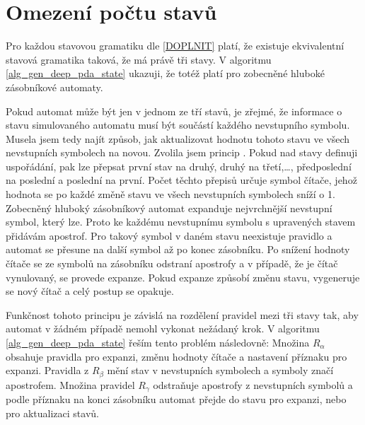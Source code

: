 \section{Omezení počtu stavů}


Pro každou stavovou gramatiku dle \ref{DOPLNIT} platí, že existuje ekvivalentní stavová gramatika taková, že má právě tři stavy. V algoritmu \ref{alg_gen_deep_pda_state} ukazuji, že totéž platí pro zobecněné hluboké zásobníkové automaty.

Pokud automat může být jen v jednom ze tří stavů, je zřejmé, že informace o stavu simulovaného automatu musí být součástí každého nevstupního symbolu. Musela jsem tedy najít způsob, jak aktualizovat hodnotu tohoto stavu ve všech nevstupních symbolech na novou. Zvolila jsem princip . Pokud nad stavy definuji uspořádání, pak lze přepsat první stav na druhý, druhý na třetí,\dots, předposlední na poslední a poslední na první. Počet těchto přepisů určuje symbol čítače, jehož hodnota se po každé změně stavu ve všech nevstupních symbolech sníží o 1. Zobecněný hluboký zásobníkový automat expanduje nejvrchnější nevstupní symbol, který lze. Proto ke každému nevstupnímu symbolu s upravených stavem přidávám apostrof. Pro takový symbol v daném stavu neexistuje pravidlo a automat se přesune na další symbol až po konec zásobníku. Po snížení hodnoty čítače se ze symbolů na zásobníku odstraní apostrofy a v případě, že je čítač vynulovaný, se provede expanze. Pokud expanze způsobí změnu stavu, vygeneruje se nový čítač a celý postup se opakuje.

Funkčnost tohoto principu je závislá na rozdělení pravidel mezi tři stavy tak, aby automat v žádném případě nemohl vykonat nežádaný krok. V algoritmu \ref{alg_gen_deep_pda_state} řeším tento problém následovně: Množina $R_{\alpha}$ obsahuje pravidla pro expanzi, změnu hodnoty čítače a nastavení příznaku pro expanzi. Pravidla z $R_{\beta}$ mění stav v nevstupních symbolech a symboly značí apostrofem. Množina pravidel $R_{\gamma}$ odstraňuje apostrofy z nevstupních symbolů a podle příznaku na konci zásobníku automat přejde do stavu pro expanzi, nebo pro aktualizaci stavů.

